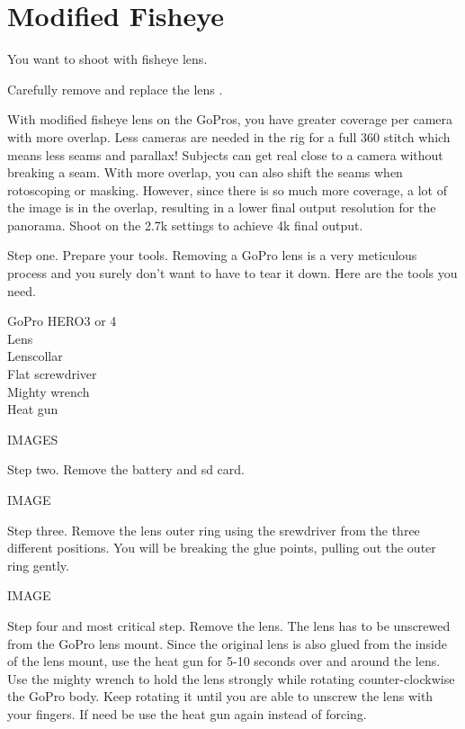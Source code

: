 \chapter{Modified Fisheye}
\pagecolor{white}
\label{chap:26}
\begin{fullwidth}

\problem

{\large You want to shoot with fisheye lens.  \par}


\solution

{\large Carefully remove and replace the lens .  
 \par}

With modified fisheye lens on the GoPros, you have greater coverage per camera with more overlap. Less cameras are needed in the rig for a full 360 stitch which means less seams and parallax! Subjects can get real close to a camera without breaking a seam. With more overlap, you can also shift the seams when rotoscoping or masking. However, since there is so much more coverage, a lot of the image is in the overlap, resulting in a lower final output resolution for the panorama. Shoot on the 2.7k settings to achieve 4k final output. 


Step one. Prepare your tools. Removing a GoPro lens is a very meticulous process and you surely don't want to have to tear it down. Here are the tools you need. 

GoPro HERO3 or 4
\\
Lens
\\
Lenscollar
\\
Flat screwdriver
\\
Mighty wrench
\\
Heat gun

IMAGES

Step two. Remove the battery and sd card.

IMAGE

Step three. Remove the lens outer ring using the srewdriver from the three different positions. You will be breaking the glue points, pulling out the outer ring gently.

IMAGE

Step four and most critical step. Remove the lens. The lens has to be unscrewed from the GoPro lens mount. Since the original lens is also glued from the inside of the lens mount, use the heat gun for 5-10 seconds over and around the lens. Use the mighty wrench to hold the lens strongly while rotating counter-clockwise the GoPro body. Keep rotating it until you are able to unscrew the lens with your fingers. If need be use the heat gun again instead of forcing.


\end{fullwidth}
